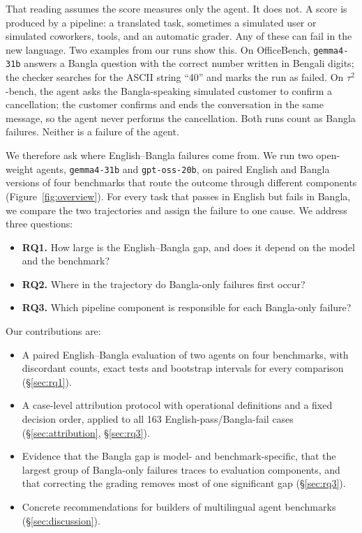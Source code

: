 \documentclass[11pt]{article}
\newcommand{\gemma}{\texttt{gemma4-31b}}
\newcommand{\gptoss}{\texttt{gpt-oss-20b}}
\newcommand{\OB}{OfficeBench}
\newcommand{\TAU}{$\tau^2$-bench}
\begin{document}
That reading assumes the score measures only the agent. It does not. A score is produced by a
pipeline: a translated task, sometimes a simulated user or simulated coworkers, tools, and an
automatic grader. Any of these can fail in the new language. Two examples from our runs show
this. On \OB{}, \gemma{} answers a Bangla question with the correct number written in Bengali
digits; the checker searches for the ASCII string ``40'' and marks the run as failed. On \TAU{},
the agent asks the Bangla-speaking simulated customer to confirm a cancellation; the customer
confirms and ends the conversation in the same message, so the agent never performs the
cancellation. Both runs count as Bangla failures. Neither is a failure of the agent.

We therefore ask where English--Bangla failures come from. We run two open-weight agents,
\gemma{} and \gptoss{}, on paired English and Bangla versions of four benchmarks that route the
outcome through different components (Figure~\ref{fig:overview}). For every task that passes in
English but fails in Bangla, we compare the two trajectories and assign the failure to one cause.
We address three questions:

\begin{itemize}[noitemsep,topsep=2pt,leftmargin=*]
\item \textbf{RQ1.} How large is the English--Bangla gap, and does it depend on the model and the
benchmark?
\item \textbf{RQ2.} Where in the trajectory do Bangla-only failures first occur?
\item \textbf{RQ3.} Which pipeline component is responsible for each Bangla-only failure?
\end{itemize}

\noindent Our contributions are:
\begin{itemize}[noitemsep,topsep=2pt,leftmargin=*]
\item A paired English--Bangla evaluation of two agents on four benchmarks, with discordant
counts, exact tests and bootstrap intervals for every comparison (\S\ref{sec:rq1}).
\item A case-level attribution protocol with operational definitions and a fixed decision order,
applied to all 163 English-pass/Bangla-fail cases (\S\ref{sec:attribution}, \S\ref{sec:rq3}).
\item Evidence that the Bangla gap is model- and benchmark-specific, that the largest group of
Bangla-only failures traces to evaluation components, and that correcting the grading removes
most of one significant gap (\S\ref{sec:rq3}).
\item Concrete recommendations for builders of multilingual agent benchmarks (\S\ref{sec:discussion}).
\end{itemize}
\end{document}
